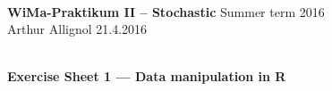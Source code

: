 \documentclass[a4,11pt]{article}\usepackage[]{graphicx}\usepackage[]{color}
\newcounter{ka}
\begin{document}
\renewcommand{\baselinestretch}{1}

\hrulefill\\
{\bf WiMa-Praktikum II -- Stochastic} \hspace{\fill} Summer term 2016\\
Arthur Allignol \hspace{\fill} 21.4.2016\\[-1.2ex]
\mbox{}\hrulefill\\
\newline \renewcommand{\baselinestretch}{1}
\setcounter{ka}{0} \vspace{-0.5cm}



\begin{center}
\large{{\bf Exercise Sheet 1 --- Data manipulation in R}}
\end{center}
\end{document}
